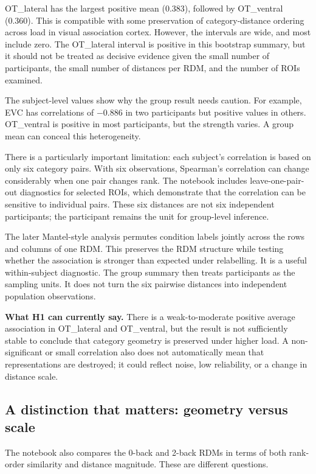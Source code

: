 \documentclass[11pt,a4paper]{article}
\begin{document}
OT\_lateral has the largest positive mean (0.383), followed by OT\_ventral (0.360). This is compatible with some preservation of category-distance ordering across load in visual association cortex. However, the intervals are wide, and most include zero. The OT\_lateral interval is positive in this bootstrap summary, but it should not be treated as decisive evidence given the small number of participants, the small number of distances per RDM, and the number of ROIs examined.

The subject-level values show why the group result needs caution. For example, EVC has correlations of \(-0.886\) in two participants but positive values in others. OT\_ventral is positive in most participants, but the strength varies. A group mean can conceal this heterogeneity.

There is a particularly important limitation: each subject's correlation is based on only six category pairs. With six observations, Spearman's correlation can change considerably when one pair changes rank. The notebook includes leave-one-pair-out diagnostics for selected ROIs, which demonstrate that the correlation can be sensitive to individual pairs. These six distances are not six independent participants; the participant remains the unit for group-level inference.

The later Mantel-style analysis permutes condition labels jointly across the rows and columns of one RDM. This preserves the RDM structure while testing whether the association is stronger than expected under relabelling. It is a useful within-subject diagnostic. The group summary then treats participants as the sampling units. It does not turn the six pairwise distances into independent population observations.

\textbf{What H1 can currently say.} There is a weak-to-moderate positive average association in OT\_lateral and OT\_ventral, but the result is not sufficiently stable to conclude that category geometry is preserved under higher load. A non-significant or small correlation also does not automatically mean that representations are destroyed; it could reflect noise, low reliability, or a change in distance scale.

\subsection{A distinction that matters: geometry versus scale}

The notebook also compares the 0-back and 2-back RDMs in terms of both rank-order similarity and distance magnitude. These are different questions.
\end{document}
